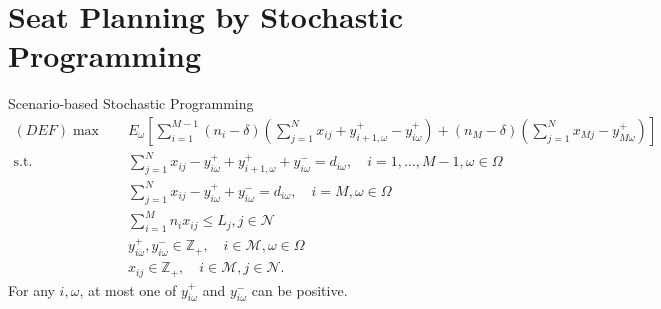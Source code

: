 
\section{Seat Planning by Stochastic Programming}
    \frame{\sectionpage}

    \begin{frame}{Scenario-based Stochastic Programming}
      \footnotesize
      \begin{equation}\label{sto_form}
        \begin{aligned}
       (DEF) \max \quad & E_{\omega}\left[\sum_{i=1}^{M-1} (n_i-\delta) (\sum_{j= 1}^{N} x_{ij} + y_{i+1,\omega}^{+} - y_{i \omega}^{+}) + (n_{M}-\delta) (\sum_{j= 1}^{N} x_{Mj} - y_{M \omega}^{+})\right] \\
        \text {s.t.} \quad & \sum_{j= 1}^{N} x_{ij}-y_{i \omega}^{+}+
        y_{i+1, \omega}^{+} + y_{i \omega}^{-}=d_{i \omega}, \quad i = 1,\ldots,M-1, \omega \in \Omega \\
        & \sum_{j= 1}^{N} x_{ij} -y_{i \omega}^{+}+y_{i \omega}^{-}=d_{i \omega}, \quad i = M, \omega \in \Omega \\
        & \sum_{i=1}^{M} n_{i} x_{ij} \leq L_j, j \in \mathcal{N}\\
        & y_{i \omega}^{+}, y_{i \omega}^{-} \in \mathbb{Z}_{+}, \quad i \in \mathcal{M}, \omega \in \Omega \\
        & x_{ij} \in \mathbb{Z}_{+}, \quad i \in \mathcal{M}, j \in \mathcal{N}.
        \end{aligned}
      \end{equation}
      For any $i, \omega$, at most one of $y_{i \omega}^{+}$ and $y_{i \omega}^{-}$ can be positive. 
    \end{frame}

